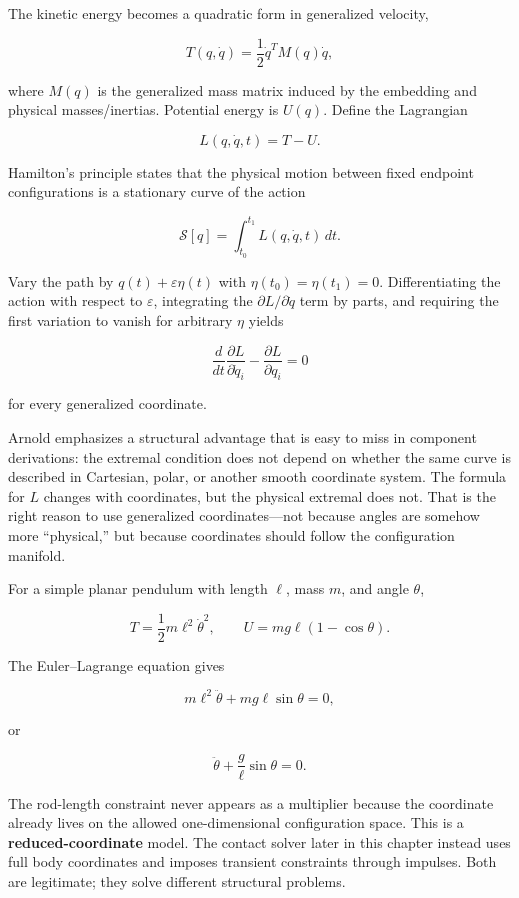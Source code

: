 The kinetic energy becomes a quadratic form in generalized velocity,

\[
T(q,\dot q)
=
\frac12
\dot q^T M(q)\dot q,
\]

where \(M(q)\) is the generalized mass matrix induced by the embedding and physical masses/inertias. Potential energy is \(U(q)\). Define the Lagrangian

\[
L(q,\dot q,t)=T-U.
\]

Hamilton's principle states that the physical motion between fixed endpoint configurations is a stationary curve of the action

\[
\mathcal S[q]
=
\int_{t_0}^{t_1}
L(q,\dot q,t)\,dt.
\]

Vary the path by \(q(t)+\varepsilon\eta(t)\) with \(\eta(t_0)=\eta(t_1)=0\). Differentiating the action with respect to \(\varepsilon\), integrating the \(\partial L/\partial\dot q\) term by parts, and requiring the first variation to vanish for arbitrary \(\eta\) yields

\[
\boxed{
\frac{d}{dt}
\frac{\partial L}{\partial\dot q_i}
-
\frac{\partial L}{\partial q_i}
=
0
}
\]

for every generalized coordinate.

Arnold emphasizes a structural advantage that is easy to miss in component derivations: the extremal condition does not depend on whether the same curve is described in Cartesian, polar, or another smooth coordinate system. The formula for \(L\) changes with coordinates, but the physical extremal does not. That is the right reason to use generalized coordinates---not because angles are somehow more ``physical,'' but because coordinates should follow the configuration manifold.

For a simple planar pendulum with length \(\ell\), mass \(m\), and angle \(\theta\),

\[
T=\frac12m\ell^2\dot\theta^2,
\qquad
U=mg\ell(1-\cos\theta).
\]

The Euler--Lagrange equation gives

\[
m\ell^2\ddot\theta
+
mg\ell\sin\theta
=
0,
\]

or

\[
\ddot\theta+\frac{g}{\ell}\sin\theta=0.
\]

The rod-length constraint never appears as a multiplier because the coordinate already lives on the allowed one-dimensional configuration space. This is a \textbf{reduced-coordinate} model. The contact solver later in this chapter instead uses full body coordinates and imposes transient constraints through impulses. Both are legitimate; they solve different structural problems.

